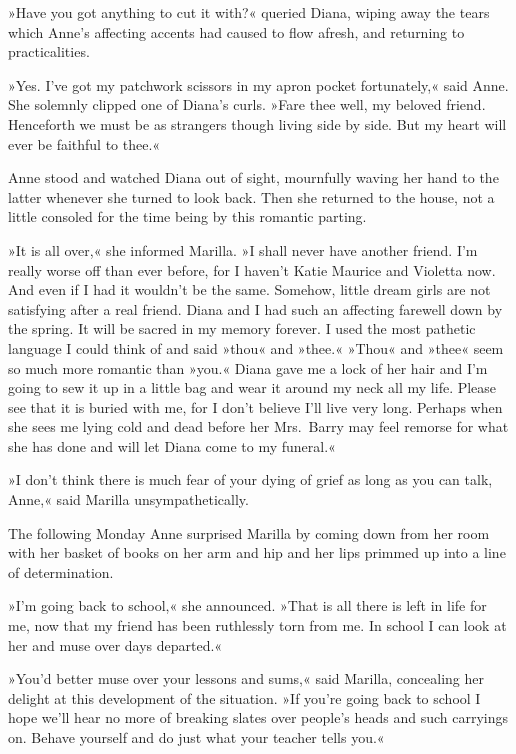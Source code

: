 »Have you got anything to cut it with?« queried Diana, wiping away the tears which Anne's affecting accents had caused to flow afresh, and returning to practicalities.

»Yes. I've got my patchwork scissors in my apron pocket fortunately,« said Anne. She solemnly clipped one of Diana's curls. »Fare thee well, my beloved friend. Henceforth we must be as strangers though living side by side. But my heart will ever be faithful to thee.«

Anne stood and watched Diana out of sight, mournfully waving her hand to the latter whenever she turned to look back. Then she returned to the house, not a little consoled for the time being by this romantic parting.

»It is all over,« she informed Marilla. »I shall never have another friend. I'm really worse off than ever before, for I haven't Katie Maurice and Violetta now. And even if I had it wouldn't be the same. Somehow, little dream girls are not satisfying after a real friend. Diana and I had such an affecting farewell down by the spring. It will be sacred in my memory forever. I used the most pathetic language I could think of and said »thou« and »thee.« »Thou« and »thee« seem so much more romantic than »you.« Diana gave me a lock of her hair and I'm going to sew it up in a little bag and wear it around my neck all my life. Please see that it is buried with me, for I don't believe I'll live very long. Perhaps when she sees me lying cold and dead before her Mrs.~Barry may feel remorse for what she has done and will let Diana come to my funeral.«

»I don't think there is much fear of your dying of grief as long as you can talk, Anne,« said Marilla unsympathetically.

The following Monday Anne surprised Marilla by coming down from her room with her basket of books on her arm and hip and her lips primmed up into a line of determination.

»I'm going back to school,« she announced. »That is all there is left in life for me, now that my friend has been ruthlessly torn from me. In school I can look at her and muse over days departed.«

»You'd better muse over your lessons and sums,« said Marilla, concealing her delight at this development of the situation. »If you're going back to school I hope we'll hear no more of breaking slates over people's heads and such carryings on. Behave yourself and do just what your teacher tells you.«


